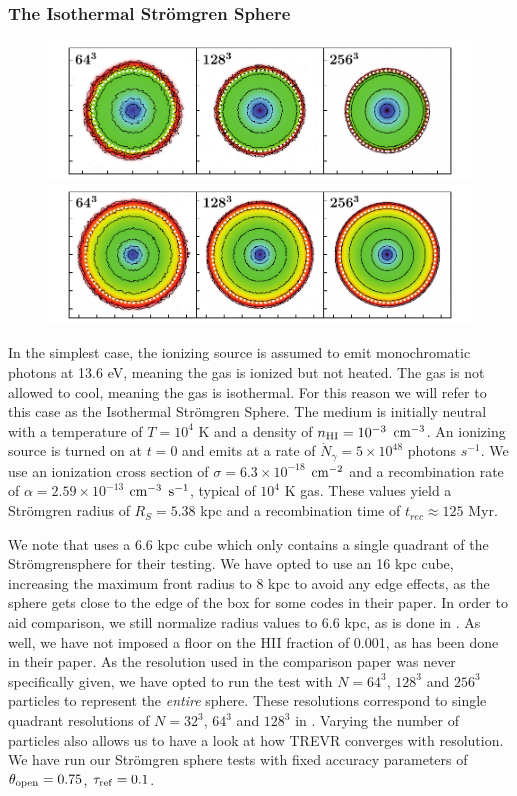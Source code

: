 \documentclass[fleq,usenatbib]{mnras}
\newcommand{\acro}{TREVR}
\newcommand{\strom}{Str\"omgren}
\begin{document}
\subsubsection{The Isothermal \strom{} Sphere}
\begin{figure}
\includegraphics[width=1\linewidth]{Figures/strom_slice_iso_030.pdf}
\includegraphics[width=1\linewidth]{Figures/strom_slice_iso_500.pdf}
\caption{}
\label{fig:stromslice}
\end{figure}
In the simplest case, the ionizing source is assumed to emit monochromatic 
photons at 13.6 eV, meaning the gas is ionized but not heated. The gas is not 
allowed to cool, meaning the gas is isothermal. For this reason we will refer 
to this case as the Isothermal \strom{} Sphere. The medium is initially 
neutral with a temperature of $T=10^4$ K and a density of $n_{\rm HI} = 
10^{-3}$ $\rm cm^{-3}$. An ionizing source is turned on at $t=0$ and emits at 
a rate of $\dot{N}_\gamma = 5 \times 10^{48}$ photons $s^{-1}$. We use an 
ionization cross section of $\sigma = 6.3 \times 10^{-18}$ $\rm cm^{-2}$ and a 
recombination rate of $\alpha = 2.59 \times 10^{-13}$ $\rm cm^{-3}$ $\rm 
s^{-1}$, typical of $10^4$ K gas. These values yield a \strom{} radius of 
$R_S = 5.38$ kpc and a recombination time of $t_{rec} \approx  125$ Myr. 

We note that \cite{ilievEt06} uses a 6.6 kpc cube which only contains a single
quadrant of the \strom sphere for their testing. We have opted to use an 16 
kpc cube, increasing the maximum front radius to 8 kpc to avoid any edge 
effects, as the sphere gets close to the edge of the box for some codes in 
their paper. In order to aid comparison, we still normalize radius values to 
6.6 kpc, as is done in \cite{ilievEt06}. As well, we have not imposed a floor 
on the HII fraction of 0.001, as has been done in their paper. As the 
resolution used in the \cite{ilievEt06} comparison paper was never 
specifically given, we have opted to run the test with $N = 64^3$, $128^3$ and 
$256^3$ particles to represent the \textit{entire} sphere. These resolutions 
correspond to single quadrant resolutions of $N=32^3$, $64^3$ and $128^3$ in 
\cite{ilievEt06}. Varying the number of particles also allows us to have a 
look at how \acro{} converges with resolution. We have run our \strom{} sphere 
tests with fixed accuracy parameters of $\theta_{\rm open} = 0.75$, 
$\tau_{\rm ref} = 0.1$.
\end{document}
